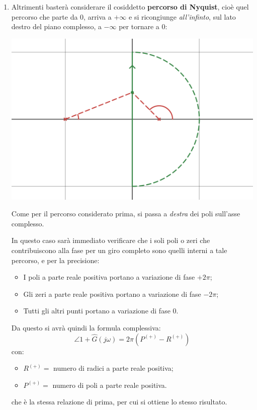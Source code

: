\documentclass[a4paper,11pt]{article}
\begin{document}
\begin{enumerate}
	\item 
		Altrimenti basterà considerare il cosiddetto \textbf{percorso di Nyquist}, cioè quel percorso che parte da $0$, arriva a $+\infty$ e si ricongiunge \textit{all'infinto}, sul lato destro del piano complesso, a $-\infty$ per tornare a 0:
		\begin{center}
			\includegraphics[scale=0.28]{../figures/nyq_crit_m2.png}
		\end{center}
		Come per il percorso considerato prima, si passa a \textit{destra} dei poli sull'asse complesso.

		In questo caso sarà immediato verificare che i soli poli o zeri che contribuiscono alla fase per un giro completo sono quelli interni a tale percorso, e per la precisione:
		\begin{itemize}
			\item I poli a parte reale positiva portano a variazione di fase $+2\pi$;
			\item Gli zeri a parte reale positiva portano a variazione di fase $-2\pi$;
			\item Tutti gli altri punti portano a variazione di fase $0$.
		\end{itemize}

		Da questo si avrà quindi la formula complessiva:
		$$
		\angle 1 + \hat{G}(j\omega) = 2\pi \left( P^{(+)} - R^{(+)} \right)
		$$
		con:
		\begin{itemize}
			\item $R^{(+)} = $ numero di radici a parte reale positiva;
			\item $P^{(+)} = $ numero di poli a parte reale positiva.
		\end{itemize}
		che è la stessa relazione di prima, per cui si ottiene lo stesso risultato.
\end{enumerate}
\end{document}
